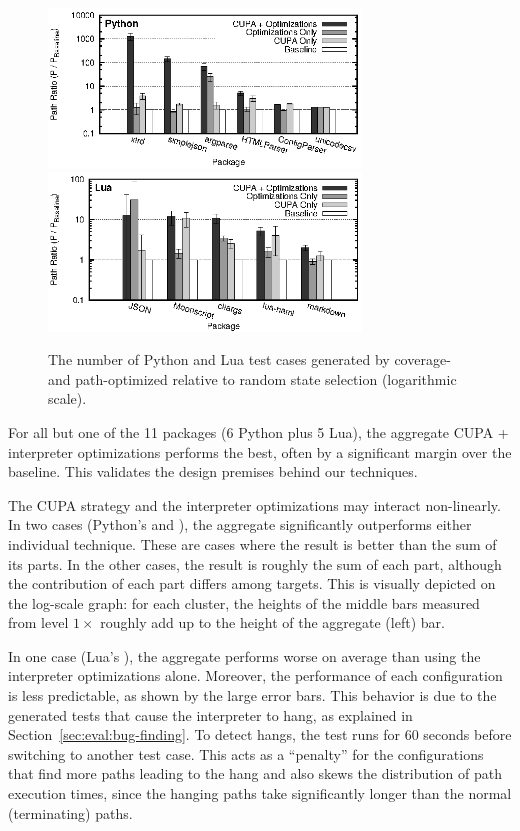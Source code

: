 \begin{figure}[t]
  \centering
  \includegraphics[width=3.27in]{figures/evaluation/bkdown-path-python} \\
  \includegraphics[width=3.27in]{figures/evaluation/bkdown-path-lua}
  \caption{The number of Python and Lua test cases generated by
    coverage- and path-optimized \cupa relative to random state
    selection (logarithmic scale).}
  \label{fig:tc-improv}
\end{figure}

For all but one of the 11 packages (6 Python plus 5 Lua), the aggregate CUPA + interpreter optimizations performs the best, often by a significant margin over the baseline.  This validates the design premises behind our techniques.

The CUPA strategy and the interpreter optimizations may interact non-linearly.  In two cases (Python's  and ), the aggregate significantly outperforms either individual technique. These are cases where the result is better than the sum of its parts.  In the other cases, the result is roughly the sum of each part, although the contribution of each part differs among targets.  This is visually depicted on the log-scale graph: for each cluster, the heights of the middle bars measured from level $1 \times$ roughly add up to the height of the aggregate (left) bar.

In one case (Lua's ), the aggregate performs worse on average than using the interpreter optimizations alone.  Moreover, the performance of each configuration is less predictable, as shown by the large error bars.  This behavior is due to the generated tests that cause the interpreter to hang, as explained in Section~\ref{sec:eval:bug-finding}.  To detect hangs, the test runs for 60 seconds before switching to another test case.  This acts as a ``penalty'' for the configurations that find more paths leading to the hang and also skews the distribution of path execution times, since the hanging paths take significantly longer than the normal (terminating) paths.

